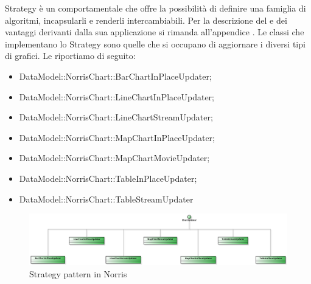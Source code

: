 			Strategy è un  comportamentale che offre la possibilità di definire una famiglia di
algoritmi, incapsularli e renderli intercambiabili. Per la descrizione del  e dei vantaggi derivanti dalla sua applicazione si rimanda all'appendice .
					Le classi che implementano lo Strategy sono quelle che si occupano di aggiornare i diversi tipi di grafici. Le riportiamo di seguito:
					\begin{itemize}
					\item DataModel::NorrisChart::BarChartInPlaceUpdater;
					\item DataModel::NorrisChart::LineChartInPlaceUpdater;
					\item DataModel::NorrisChart::LineChartStreamUpdater;
					\item DataModel::NorrisChart::MapChartInPlaceUpdater;
					\item DataModel::NorrisChart::MapChartMovieUpdater;
					\item DataModel::NorrisChart::TableInPlaceUpdater;
					\item DataModel::NorrisChart::TableStreamUpdater
				\end{itemize}
				\begin{figure}[H]\centering
	        		\includegraphics[width=\textwidth]{SpecificaTecnica/Pics/DesignPatternNorris/Strategy}
	        		\caption{Strategy pattern in Norris}
	    		\end{figure}
	    			
		
